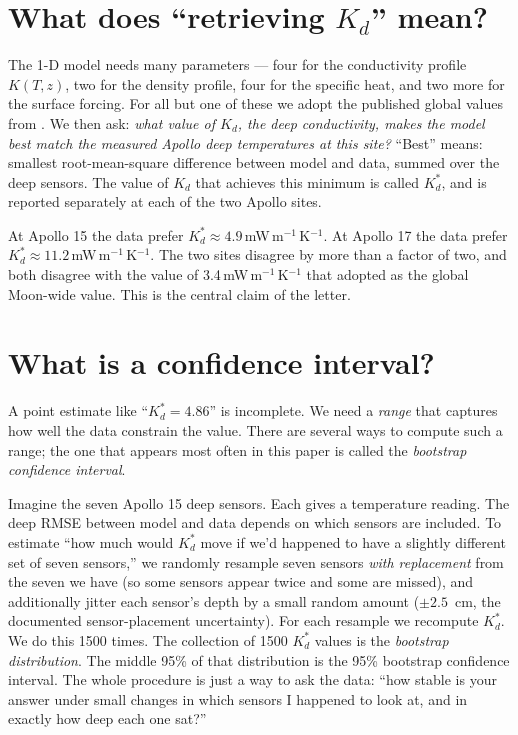 \documentclass[11pt]{report}
\begin{document}
\section{What does ``retrieving $K_d$'' mean?}

The 1-D model needs many parameters --- four for the conductivity
profile $K(T,z)$, two for the density profile, four for the
specific heat, and two more for the surface forcing. For all but
one of these we adopt the published global values from
\citet{hayne2017}. We then ask: \emph{what value of $K_d$, the
deep conductivity, makes the model best match the measured Apollo
deep temperatures at this site?} ``Best'' means: smallest
root-mean-square difference between model and data, summed over the
deep sensors. The value of $K_d$ that achieves this minimum is
called $K_d^{*}$, and is reported separately at each of the two
Apollo sites.

\begin{key}
At Apollo 15 the data prefer $K_d^{*} \approx 4.9$\,mW\,m$^{-1}$\,K$^{-1}$.
At Apollo 17 the data prefer $K_d^{*} \approx 11.2$\,mW\,m$^{-1}$\,K$^{-1}$.
The two sites disagree by more than a factor of two, and both
disagree with the value of 3.4\,mW\,m$^{-1}$\,K$^{-1}$ that
\citet{hayne2017} adopted as the global Moon-wide value. This is
the central claim of the letter.
\end{key}

\section{What is a confidence interval?}

A point estimate like ``$K_d^{*} = 4.86$'' is incomplete. We need a
\emph{range} that captures how well the data constrain the value.
There are several ways to compute such a range; the one that
appears most often in this paper is called the \emph{bootstrap
confidence interval}.

\begin{aside}
Imagine the seven Apollo 15 deep sensors. Each gives a
temperature reading. The deep RMSE between model and data depends
on which sensors are included. To estimate ``how much would $K_d^{*}$
move if we'd happened to have a slightly different set of seven
sensors,'' we randomly resample seven sensors \emph{with
replacement} from the seven we have (so some sensors appear twice
and some are missed), and additionally jitter each sensor's depth
by a small random amount ($\pm 2.5$~cm, the documented
sensor-placement uncertainty). For each resample we recompute
$K_d^{*}$. We do this 1500 times. The collection of 1500 $K_d^{*}$
values is the \emph{bootstrap distribution}. The middle 95\% of that
distribution is the 95\% bootstrap confidence interval. The whole
procedure is just a way to ask the data: ``how stable is your answer
under small changes in which sensors I happened to look at, and in
exactly how deep each one sat?''
\end{aside}
\end{document}
